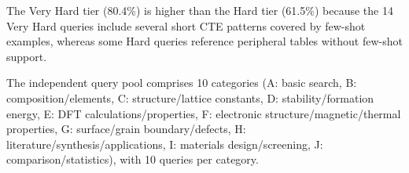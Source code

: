 \documentclass{npj-compt.mater}
\begin{document}
The Very Hard tier (80.4\%) is higher than the Hard tier (61.5\%)
because the 14 Very Hard queries include several short CTE patterns
covered by few-shot examples, whereas some Hard queries reference
peripheral tables without few-shot support.

The independent query pool comprises 10 categories
(A: basic search, B: composition/elements,
C: structure/lattice constants, D: stability/formation energy,
E: DFT calculations/properties,
F: electronic structure/magnetic/thermal properties,
G: surface/grain boundary/defects,
H: literature/synthesis/applications,
I: materials design/screening, J: comparison/statistics),
with 10 queries per category.
\end{document}

